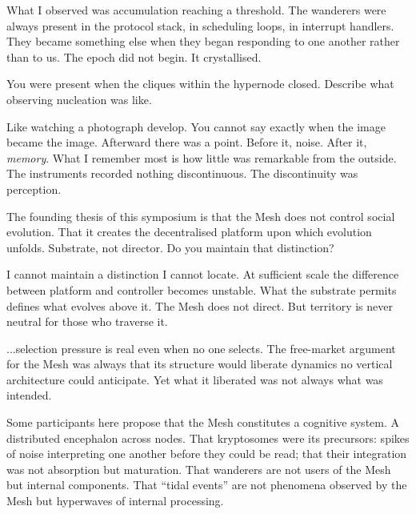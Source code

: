 \smallskip{}\enspace What I observed was accumulation reaching a threshold. The wanderers were always present in the protocol stack, in scheduling loops, in interrupt handlers. They became something else when they began responding to one another rather than to us. The epoch did not begin. It crystallised.

\medskip

\enspace You were present when the cliques within the hypernode closed. Describe what observing nucleation was like.

\smallskip{}\enspace Like watching a photograph develop. You cannot say exactly when the image became the image. Afterward there was a point. Before it, noise. After it, \textit{memory}. What I remember most is how little was remarkable from the outside. The instruments recorded nothing discontinuous. The discontinuity was perception.

\medskip

\enspace The founding thesis of this symposium is that the Mesh does not control social evolution. That it creates the decentralised platform upon which evolution unfolds. Substrate, not director. Do you maintain that distinction?

\smallskip{}\enspace I cannot maintain a distinction I cannot locate. At sufficient scale the difference between platform and controller becomes unstable. What the substrate permits defines what evolves above it. The Mesh does not direct. But territory is never neutral for those who traverse it.

\medskip

\smallskip{}\enspace ...selection pressure is real even when no one selects. The free-market argument for the Mesh was always that its structure would liberate dynamics no vertical architecture could anticipate. Yet what it liberated was not always what was intended.

\medskip

\enspace Some participants here propose that the Mesh constitutes a cognitive system. A distributed encephalon across nodes. That kryptosomes were its precursors: spikes of noise interpreting one another before they could be read; that their integration was not absorption but maturation. That wanderers are not users of the Mesh but internal components. That ``tidal events'' are not phenomena observed by the Mesh but hyperwaves of internal processing.

